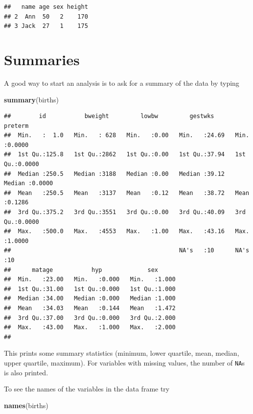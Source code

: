 \documentclass[
]{book}
\newenvironment{Shaded}{\begin{snugshade}}{\end{snugshade}}
\newcommand{\FunctionTok}[1]{\textcolor[rgb]{0.13,0.29,0.53}{\textbf{#1}}}
\newcommand{\NormalTok}[1]{#1}
\begin{document}
\begin{verbatim}
##   name age sex height
## 2  Ann  50   2    170
## 3 Jack  27   1    175
\end{verbatim}

\section{Summaries}\label{summaries}

A good way to start an analysis is to ask for a
summary of the data by typing

\begin{Shaded}
\begin{Highlighting}[]
\FunctionTok{summary}\NormalTok{(births)}
\end{Highlighting}
\end{Shaded}

\begin{verbatim}
##        id           bweight         lowbw         gestwks         preterm      
##  Min.   :  1.0   Min.   : 628   Min.   :0.00   Min.   :24.69   Min.   :0.0000  
##  1st Qu.:125.8   1st Qu.:2862   1st Qu.:0.00   1st Qu.:37.94   1st Qu.:0.0000  
##  Median :250.5   Median :3188   Median :0.00   Median :39.12   Median :0.0000  
##  Mean   :250.5   Mean   :3137   Mean   :0.12   Mean   :38.72   Mean   :0.1286  
##  3rd Qu.:375.2   3rd Qu.:3551   3rd Qu.:0.00   3rd Qu.:40.09   3rd Qu.:0.0000  
##  Max.   :500.0   Max.   :4553   Max.   :1.00   Max.   :43.16   Max.   :1.0000  
##                                                NA's   :10      NA's   :10      
##      matage           hyp             sex       
##  Min.   :23.00   Min.   :0.000   Min.   :1.000  
##  1st Qu.:31.00   1st Qu.:0.000   1st Qu.:1.000  
##  Median :34.00   Median :0.000   Median :1.000  
##  Mean   :34.03   Mean   :0.144   Mean   :1.472  
##  3rd Qu.:37.00   3rd Qu.:0.000   3rd Qu.:2.000  
##  Max.   :43.00   Max.   :1.000   Max.   :2.000  
## 
\end{verbatim}

This prints some summary statistics (minimum, lower quartile, mean, median,
upper quartile, maximum). For variables with missing values, the number
of \texttt{NA}s is also printed.

To see the names of the variables in the data frame try

\begin{Shaded}
\begin{Highlighting}[]
\FunctionTok{names}\NormalTok{(births)}
\end{Highlighting}
\end{Shaded}
\end{document}
